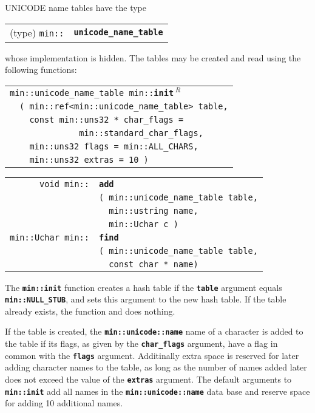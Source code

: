 \documentclass[12pt]{article}
\makeatletter
\newcommand{\TT}[1]{{\tt \bfseries #1}}
\newcommand{\ttindex}[1]{\index{#1@{\tt #1}}}
\newcommand{\EOL}{\penalty \exhyphenpenalty}
\newenvironment{indpar}[1][0.3in]%
	{\begin{list}{}%
		     {\setlength{\itemsep}{0in}%
		      \setlength{\topsep}{0in}%
		      \setlength{\parsep}{1ex}%
		      \setlength{\labelwidth}{#1}%
		      \setlength{\leftmargin}{#1}%
		      \addtolength{\leftmargin}{\labelsep}}%
	 \item}%
	{\end{list}}
\newcommand{\LABEL}[1]{\label{#1}}
\newlength{\ARGBREAKLENGTH}
\newcommand{\ARGBREAK}[1][\ARGBREAKLENGTH]{\\&\hspace*{#1}}
\newcommand{\MINKEY}[1]%
	   {\TT{#1}\ttindex{min::#1}\ttindex{#1}}
\newcommand{\REL}{$\,^R$}
\makeatother
\begin{document}
UNICODE name tables have the type

\begin{indpar}[1em]\begin{tabular}{r@{}l}
(type) \verb|min::| & \MINKEY{unicode\_name\_table}
\LABEL{MIN::UNICODE_NAME_TABLE} \\
\end{tabular}\end{indpar}

whose implementation is hidden.  The tables may be created and
read using the following functions:

\begin{indpar}\begin{tabular}{r@{}l}
\multicolumn{2}{l}{{\tt min::unicode\_name\_table
                        min::}\MINKEY{init\REL}}\ARGBREAK
    \verb|( min::ref<min::unicode_name_table> table,|\ARGBREAK
    \verb|  const min::uns32 * char_flags =|\ARGBREAK
    \verb|            min::standard_char_flags,|\ARGBREAK
    \verb|  min::uns32 flags = min::ALL_CHARS,|\ARGBREAK
    \verb|  min::uns32 extras = 10 )|
\LABEL{MIN::INIT_OF_UNICODE_NAME_TABLE} \\
\end{tabular}\end{indpar}

\begin{indpar}\begin{tabular}{r@{}l}
\verb|void min::| & \MINKEY{add}\ARGBREAK
    \verb|( min::unicode_name_table table,|\ARGBREAK
    \verb|  min::ustring name,|\ARGBREAK
    \verb|  min::Uchar c )|
\LABEL{MIN::ADD_OF_UNICODE_NAME_TABLE} \\
\verb|min::Uchar min::| & \MINKEY{find}\ARGBREAK
    \verb|( min::unicode_name_table table,|\ARGBREAK
    \verb|  const char * name)|
\LABEL{MIN::FIND_OF_UNICODE_NAME_TABLE} \\
\end{tabular}\end{indpar}

The \TT{min::init} function creates a hash table
if the \TT{table} argument equals \TT{min::\EOL NULL\_\EOL STUB},
and sets this argument to the new hash table.  If the table
already exists, the function and does nothing.  

If the table is created, the \TT{min::\EOL unicode::\EOL name}
name of a character is added to the table if its flags,
as given by the \TT{char\_\EOL flags} argument,
have a flag in common with the \TT{flags} argument.
Additinally extra space is reserved for later adding character
names to the table, as long as the number of names added later
does not exceed the value of the \TT{extras} argument.
The default arguments to \TT{min::\EOL init} add all names
in the \TT{min::\EOL unicode::\EOL name} data base and reserve
space for adding 10 additional names.
\end{document}
